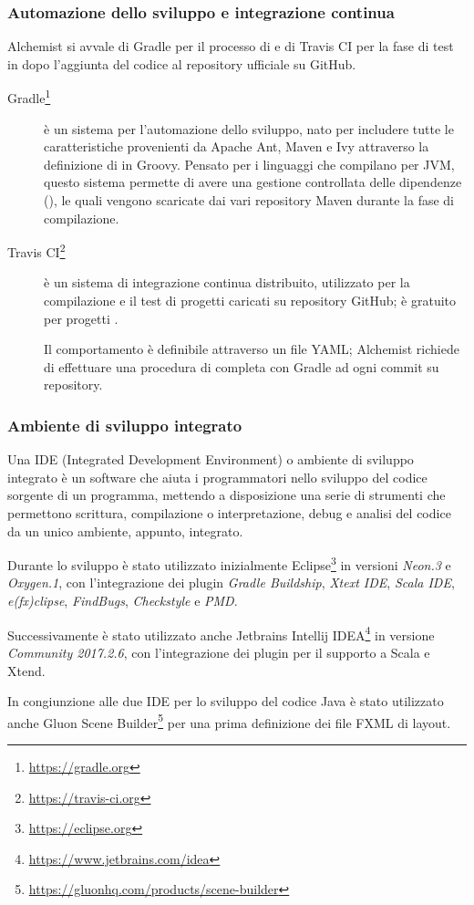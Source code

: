            \subsubsection{Automazione dello sviluppo e integrazione continua}\label{subsub:buildECI}
                Alchemist si avvale di Gradle per il processo di  e di Travis CI per la fase di test in  dopo l'aggiunta del codice al repository ufficiale su GitHub.

                \begin{description}
                    \item[Gradle\footnote{\url{https://gradle.org}}] è un sistema per l’automazione dello sviluppo, nato per includere tutte le caratteristiche provenienti da Apache Ant, Maven e Ivy attraverso la definizione di  in Groovy. Pensato per i linguaggi che compilano per JVM, questo sistema permette di avere una gestione controllata delle dipendenze (), le quali vengono scaricate dai vari repository Maven durante la fase di compilazione.

                    \item[Travis CI\footnote{\url{https://travis-ci.org}}] è un sistema di integrazione continua distribuito, utilizzato per la compilazione e il test di progetti caricati su repository GitHub; è gratuito per progetti .

                    Il comportamento è definibile attraverso un file YAML; Alchemist richiede di effettuare una procedura di  completa con Gradle ad ogni commit su repository.

                \end{description}

            \subsubsection{Ambiente di sviluppo integrato}\label{subsub:IDE}
                Una IDE (Integrated Development Environment) o ambiente di sviluppo integrato è un software che aiuta i programmatori nello sviluppo del codice sorgente di un programma, mettendo a disposizione una serie di strumenti che permettono scrittura, compilazione o interpretazione, debug e analisi del codice da un unico ambiente, appunto, integrato.

                Durante lo sviluppo è stato utilizzato inizialmente Eclipse\footnote{\url{https://eclipse.org}} in versioni \textit{Neon.3} e \textit{Oxygen.1}, con l’integrazione dei plugin \emph{Gradle Buildship}, \emph{Xtext IDE}, \emph{Scala IDE}, \emph{e(fx)clipse}, \emph{FindBugs}, \emph{Checkstyle} e \emph{PMD}.

                Successivamente è stato utilizzato anche Jetbrains Intellij IDEA\footnote{\url{https://www.jetbrains.com/idea}} in versione \textit{Community 2017.2.6}, con l'integrazione dei plugin per il supporto a Scala e Xtend.

                In congiunzione alle due IDE per lo sviluppo del codice Java è stato utilizzato anche Gluon Scene Builder\footnote{\url{https://gluonhq.com/products/scene-builder}} per una prima definizione dei file FXML di layout.
